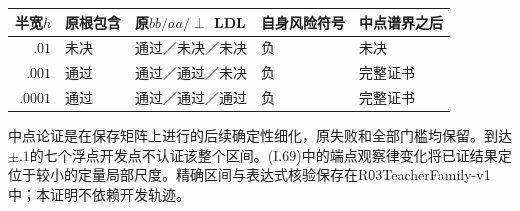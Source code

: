 \documentclass[11pt,a4paper]{article}
\begin{document}
\begin{longtable}[]{@{}rllll@{}}
\toprule\noalign{}
半宽\(h\) & 原根包含 & 原\(bb/aa/\perp\) LDL & 自身风险符号 &
中点谱界之后 \\
\midrule\noalign{}
\endhead
\bottomrule\noalign{}
\endlastfoot
\(.01\) & 未决 & 通过／未决／未决 & 负 & 未决 \\
\(.001\) & 通过 & 通过／通过／未决 & 负 & 完整证书 \\
\(.0001\) & 通过 & 通过／通过／通过 & 负 & 完整证书 \\
\end{longtable}

中点论证是在保存矩阵上进行的后续确定性细化，原失败和全部门槛均保留。到达\(\pm.1\)的七个浮点开发点不认证该整个区间。(I.69)中的端点观察律变化将已证结果定位于较小的定量局部尺度。精确区间与表达式核验保存在R03TeacherFamily-v1中；本证明不依赖开发轨迹。
\end{document}
